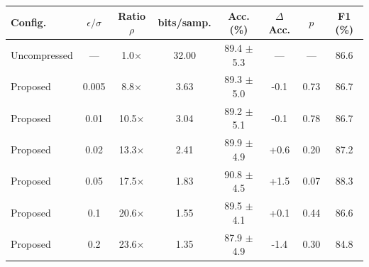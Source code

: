 \begin{tabular}{lccccccc}
\toprule
Config. & $\epsilon/\sigma$ & Ratio $\rho$ & bits/samp. & Acc. (\%) & $\Delta$Acc. & $p$ & F1 (\%) \\
\midrule
Uncompressed & --- & 1.0$\times$ & 32.00 & 89.4 $\pm$ 5.3 & --- & --- & 86.6 \\
Proposed & 0.005 & 8.8$\times$ & 3.63 & 89.3 $\pm$ 5.0 & -0.1 & 0.73 & 86.7 \\
Proposed & 0.01 & 10.5$\times$ & 3.04 & 89.2 $\pm$ 5.1 & -0.1 & 0.78 & 86.7 \\
Proposed & 0.02 & 13.3$\times$ & 2.41 & 89.9 $\pm$ 4.9 & +0.6 & 0.20 & 87.2 \\
Proposed & 0.05 & 17.5$\times$ & 1.83 & 90.8 $\pm$ 4.5 & +1.5 & 0.07 & 88.3 \\
Proposed & 0.1 & 20.6$\times$ & 1.55 & 89.5 $\pm$ 4.1 & +0.1 & 0.44 & 86.6 \\
Proposed & 0.2 & 23.6$\times$ & 1.35 & 87.9 $\pm$ 4.9 & -1.4 & 0.30 & 84.8 \\
\bottomrule
\end{tabular}
